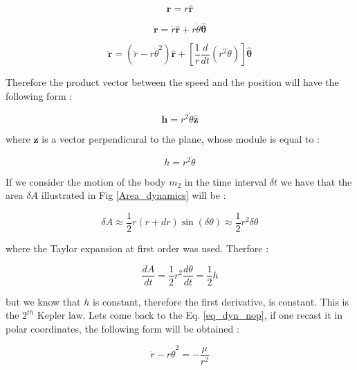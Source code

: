 \documentclass[12pt,%
               a4paper,%
               oneside,openany,%
               titlepage,%
               headinclude,footinclude,%
               BCOR5mm,%
               cleardoublepage=empty,%
               tablecaptionabove,%
               floatperchapter,
               ]{scrreprt}                 %
\begin{document}
\begin{equation}
\textbf{r}=r\hat{\textbf{r}}
\end{equation}

\begin{equation}
\dot{\textbf{r}}=\dot{r}\hat{\textbf{r}}+r\dot{\theta}\hat{\boldsymbol{\theta}}
\label{eq_dyn_nop}
\end{equation}

\begin{equation}
\ddot{\textbf{r}}=\left(\ddot{r}-r\dot{\theta}^{2}\right)\hat{\textbf{r}}+\left[\dfrac{1}{r}\frac{d}{dt}\left(r^{2}\dot{\theta}\right)\right]\hat{\boldsymbol{\theta}}
\end{equation}

Therefore the product vector between the speed and the position will have the following form \cite{murray1999solar}:

\begin{equation}
\textbf{h}=r^{2}\dot{\theta}\hat{\textbf{z}}
\end{equation}

where $\textbf{z}$ is a vector perpendicural to the plane, whose module is equal to \cite{murray1999solar}:

\begin{equation}
h=r^{2}\dot{\theta}
\end{equation}

If we consider the motion of the body $m_{2}$ in the time interval $\delta t$ we have that the area $\delta A$ illustrated in Fig \ref{Area_dynamics} will be \cite{murray1999solar}:

\begin{equation}
\delta A \approx \dfrac{1}{2} r(r+dr)\sin(\delta\theta) \approx  \dfrac{1}{2} r^{2}\delta\theta
\end{equation}

where the Taylor expansion at first order was used. Therfore  \cite{murray1999solar}:

\begin{equation}
\dfrac{dA}{dt}=\dfrac{1}{2}r^{2}\dfrac{d\theta}{dt}=\dfrac{1}{2}h
\end{equation}

but we know that $h$ is constant, therefore the first derivative, is constant. This is the $2^{th}$ Kepler law. Lets come back to the Eq. \ref{eq_dyn_nop}, if one recast it in polar coordinates, the following form will be obtained \cite{murray1999solar}:

\begin{equation}
\ddot{r}-r\dot{\theta}^{2}=-\frac{\mu}{r^{2}}
\end{equation}
\end{document}
